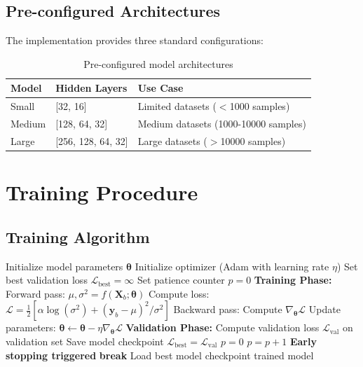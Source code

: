 \documentclass[11pt,a4paper]{article}
\begin{document}
\subsection{Pre-configured Architectures}

The implementation provides three standard configurations:

\begin{table}[h]
\centering
\begin{tabular}{lll}
\toprule
\textbf{Model} & \textbf{Hidden Layers} & \textbf{Use Case} \\
\midrule
Small & [32, 16] & Limited datasets ($<$1000 samples) \\
Medium & [128, 64, 32] & Medium datasets (1000-10000 samples) \\
Large & [256, 128, 64, 32] & Large datasets ($>$10000 samples) \\
\bottomrule
\end{tabular}
\caption{Pre-configured model architectures}
\end{table}

\section{Training Procedure}

\subsection{Training Algorithm}

\begin{algorithm}[H]
\caption{Uncertainty Quantification Training}
\begin{algorithmic}[1]
\STATE Initialize model parameters $\boldsymbol{\theta}$
\STATE Initialize optimizer (Adam with learning rate $\eta$)
\STATE Set best validation loss $\mathcal{L}_{\text{best}} = \infty$
\STATE Set patience counter $p = 0$
    \STATE \textbf{Training Phase:}
        \STATE Forward pass: $\mu, \sigma^2 = f(\mathbf{X}_b; \boldsymbol{\theta})$
        \STATE Compute loss: $\mathcal{L} = \frac{1}{2}[\alpha\log(\sigma^2) + (\mathbf{y}_b - \mu)^2/\sigma^2]$
        \STATE Backward pass: Compute $\nabla_{\boldsymbol{\theta}} \mathcal{L}$
        \STATE Update parameters: $\boldsymbol{\theta} \leftarrow \boldsymbol{\theta} - \eta \nabla_{\boldsymbol{\theta}} \mathcal{L}$
    \ENDFOR
    \STATE \textbf{Validation Phase:}
    \STATE Compute validation loss $\mathcal{L}_{\text{val}}$ on validation set
        \STATE Save model checkpoint
        \STATE $\mathcal{L}_{\text{best}} = \mathcal{L}_{\text{val}}$
        \STATE $p = 0$
    \ELSE
        \STATE $p = p + 1$
            \STATE \textbf{Early stopping triggered}
            \STATE \textbf{break}
        \ENDIF
    \ENDIF
\ENDFOR
\STATE Load best model checkpoint
\RETURN trained model
\end{algorithmic}
\end{algorithm}
\end{document}
